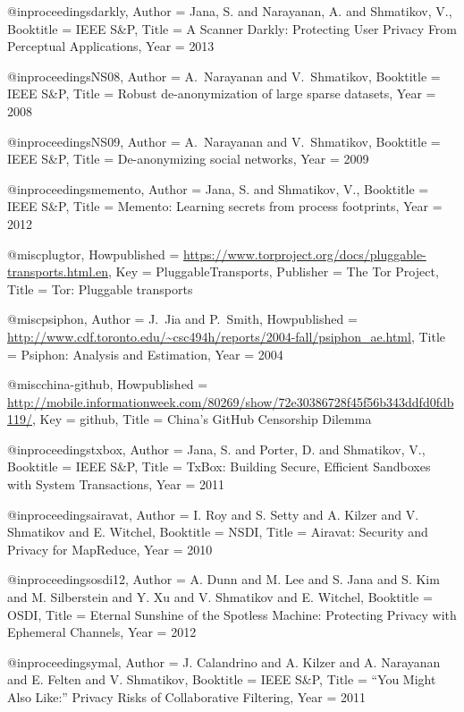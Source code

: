 {{{{{{{{{@inproceedings{darkly,
	Author = {Jana, S. and Narayanan, A. and Shmatikov, V.},
	Booktitle = {IEEE S\&P},
	Title = {{A Scanner Darkly: Protecting User Privacy From Perceptual Applications}},
	Year = {2013}}

@inproceedings{NS08,
	Author = {A.~Narayanan and V.~Shmatikov},
	Booktitle = {IEEE S\&P},
	Title = {Robust de-anonymization of large sparse datasets},
	Year = {2008}}

@inproceedings{NS09,
	Author = {A.~Narayanan and V.~Shmatikov},
	Booktitle = {IEEE S\&P},
	Title = {De-anonymizing social networks},
	Year = {2009}}

@inproceedings{memento,
	Author = {Jana, S. and Shmatikov, V.},
	Booktitle = {IEEE S\&P},
	Title = {{Memento: Learning secrets from process footprints}},
	Year = {2012}}

@misc{plugtor,
	Howpublished = {\url{https://www.torproject.org/docs/pluggable-transports.html.en}},
	Key = {PluggableTransports},
	Publisher = {The Tor Project},
	Title = {{Tor: Pluggable transports}}}

@misc{psiphon,
	Author = {J.~Jia and P.~Smith},
	Howpublished = {\url{http://www.cdf.toronto.edu/~csc494h/reports/2004-fall/psiphon_ae.html}},
	Title = {{Psiphon: Analysis and Estimation}},
	Year = 2004}

@misc{china-github,
	Howpublished = {\url{http://mobile.informationweek.com/80269/show/72e30386728f45f56b343ddfd0fdb119/}},
	Key = {github},
	Title = {{China's GitHub Censorship Dilemma}}}

@inproceedings{txbox,
	Author = {Jana, S. and Porter, D. and Shmatikov, V.},
	Booktitle = {IEEE S\&P},
	Title = {{TxBox: Building Secure, Efficient Sandboxes with System Transactions}},
	Year = {2011}}

@inproceedings{airavat,
	Author = {I. Roy and S. Setty and A. Kilzer and V. Shmatikov and E. Witchel},
	Booktitle = {NSDI},
	Title = {{Airavat: Security and Privacy for MapReduce}},
	Year = {2010}}

@inproceedings{osdi12,
	Author = {A. Dunn and M. Lee and S. Jana and S. Kim and M. Silberstein and Y. Xu and V. Shmatikov and E. Witchel},
	Booktitle = {OSDI},
	Title = {{Eternal Sunshine of the Spotless Machine: Protecting Privacy with Ephemeral Channels}},
	Year = {2012}}

@inproceedings{ymal,
	Author = {J. Calandrino and A. Kilzer and A. Narayanan and E. Felten and V. Shmatikov},
	Booktitle = {IEEE S\&P},
	Title = {{``You Might Also Like:'' Privacy Risks of Collaborative Filtering}},
	Year = {2011}}

}}}}}}}}}
